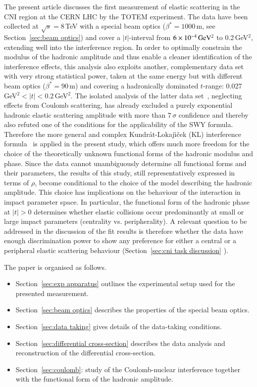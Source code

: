 The present article discusses the first measurement of elastic scattering in the
CNI region at the CERN LHC by the TOTEM experiment. 
The data have been collected at $\sqrt{s} = 8\,$TeV with a special beam optics 
($\beta^{*}=1000\,$m, see Section~\ref{sec:beam optics}) and cover a $|t|$-interval from $6\times10^{-4}\,\rm GeV^{2}$ to 0.2\,GeV$^{2}$, extending well into 
the interference region. 
In order to optimally constrain the modulus of the hadronic amplitude and thus enable a cleaner identification of the interference effects, 
this analysis also exploits another, complementary data set with very strong statistical power, taken at the same energy but with different beam optics ($\beta^{*}=90\,$m) and covering a hadronically dominated $t$-range: 0.027\,GeV$^{2} < |t| < 0.2\,$GeV$^{2}$. The isolated analysis of the
latter data set~\cite{8tev-90m}, neglecting effects from Coulomb scattering, has already excluded a purely exponential hadronic elastic scattering
amplitude with more than $7\,\sigma$ confidence and thereby also refuted
one of the conditions for the applicability of the SWY formula.
Therefore the more general and complex Kundr\'{a}t-Lokaj\'{\i}\v{c}ek (KL) interference 
formula~\cite{kl94} is applied in the present study, which offers much more freedom for the
choice of the theoretically unknown functional forms of the hadronic modulus 
and phase. Since the data cannot unambiguously determine all functional forms and their parameters, the results of this study, still representatively 
expressed in terms of $\rho$, become conditional to the choice of the model 
describing the hadronic amplitude. This choice has implications on the behaviour of the interaction in impact parameter space. In particular, the functional 
form of the hadronic phase at $|t|>0$ determines whether elastic collisions occur predominantly at small or large impact parameters (centrality vs. peripherality). A relevant question to be addressed in the discussion of the fit results is therefore whether the data have enough discrimination power to show any preference for either a central or a peripheral elastic scattering behaviour (Section~\ref{sec:cni task discussion} ).

The paper is organised as follows.
\begin{itemize}
\item Section~\ref{sec:exp apparatus} outlines the experimental setup used for the presented measurement.
\item Section~\ref{sec:beam optics} describes the properties of the special beam optics.
\item Section~\ref{sec:data taking} gives details of the data-taking conditions.
\item Section~\ref{sec:differential cross-section} describes the data analysis and reconstruction of the differential cross-section.
\item Section~\ref{sec:coulomb}: study of the Coulomb-nuclear interference together with the functional form of the hadronic amplitude.
\end{itemize}

